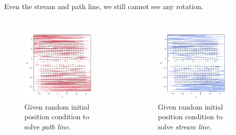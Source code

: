 \documentclass[11pt,]{beamer}
\begin{document}
\begin{frame}
Even the stream and path line, we still cannot see any rotation.
	\begin{columns}[t]
		\begin{column}{0.5\textwidth}
			\begin{figure}
			\includegraphics[page=1, width=0.9\textwidth]{flow-(-y,0)-path.pdf}
			\caption{Given random initial position condition to solve \textit{path line}.}
			\end{figure}
		\end{column}
		\begin{column}{0.5\textwidth}
			\begin{figure}
			\includegraphics[page=1, width=0.9\textwidth]{flow-(-y,0)-stream.pdf}
			\caption{Given random initial position condition to solve \textit{stream line}.}
			\end{figure}
		\end{column}
	\end{columns}
\end{frame}
\end{document}
